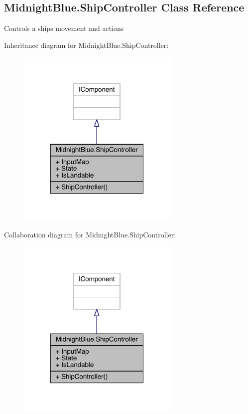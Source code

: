 \hypertarget{class_midnight_blue_1_1_ship_controller}{}\subsection{Midnight\+Blue.\+Ship\+Controller Class Reference}
\label{class_midnight_blue_1_1_ship_controller}


Controls a ships movement and actions  




Inheritance diagram for Midnight\+Blue.\+Ship\+Controller\+:\nopagebreak
\begin{figure}[H]
\begin{center}
\leavevmode
\includegraphics[width=220pt]{class_midnight_blue_1_1_ship_controller__inherit__graph}
\end{center}
\end{figure}


Collaboration diagram for Midnight\+Blue.\+Ship\+Controller\+:\nopagebreak
\begin{figure}[H]
\begin{center}
\leavevmode
\includegraphics[width=220pt]{class_midnight_blue_1_1_ship_controller__coll__graph}
\end{center}
\end{figure}
